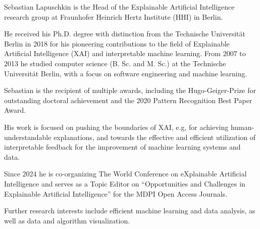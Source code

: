 
\vspace{-1.3em} %

\begin{multicols}{2}  %
\noindent

Sebastian Lapuschkin is the Head of the Explainable Artificial Intelligence research group at Fraunhofer Heinrich Hertz Institute (HHI) in Berlin.

He received his Ph.D. degree with distinction from the Technische Universität Berlin in 2018
for his pioneering contributions to the field of Explainable Artificial Intelligence (XAI) and interpretable machine learning.
From 2007 to 2013 he studied computer science (B. Sc. and M. Sc.) at the Technische Universität Berlin,
with a focus on software engineering and machine learning.

Sebastian is the recipient of multiple awards, including the Hugo-Geiger-Prize for outstanding doctoral achievement and the 2020 Pattern Recognition Best Paper Award.

His work is focused on pushing the boundaries of XAI, e.g, for achieving human-understandable explanations,
and towards the effective and efficient utilization of interpretable feedback for the improvement of machine learning systems and data.

Since 2024 he is co-organizing The World Conference on eXplainable Artificial Intelligence and serves as a Topic Editor on ``Opportunities and Challenges in Explainable Artificial Intelligence'' for the MDPI Open Access Journals.

Further research interests include efficient machine learning and data analysis, as well as data and algorithm visualization.

\end{multicols}
